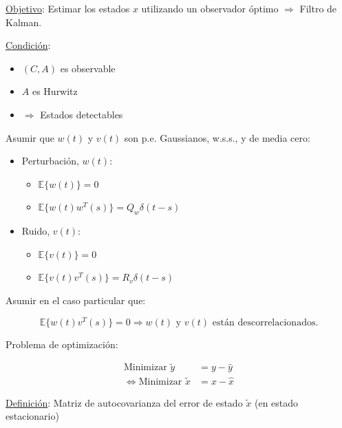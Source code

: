 \par \underline{Objetivo}: Estimar los estados $x$ utilizando un observador óptimo $\Longrightarrow$ Filtro de Kalman.\\

\par \underline{Condición}: 

\begin{itemize}
    \item $(C,A)$ es observable
    \item $A$ es Hurwitz
    \item $\Longrightarrow$ Estados detectables
\end{itemize}

Asumir que $w(t)$ y $v(t)$ son p.e. Gaussianos, w.s.s., y de media cero:

\begin{itemize}
    \item Perturbación, $w(t)$: \begin{itemize}
        \item $\mathbb{E}\{w(t)\}=0$
        \item $\mathbb{E}\{w(t) w^T (s)\}=Q_w \delta(t-s)$
    \end{itemize}
    \item Ruido, $v(t)$: \begin{itemize}
         \item $\mathbb{E}\{v(t)\}=0$
        \item $\mathbb{E}\{v(t) v^T (s)\}=R_v \delta(t-s)$
    \end{itemize}
\end{itemize}

Asumir en el caso particular que:

$$\mathbb{E}\{w(t)v^T (s)\}=0 \Longrightarrow \text{$w(t)$ y $v(t)$ están descorrelacionados.}$$


\par Problema de optimización: 

\begin{align*}
    \text{Minimizar } \tilde{y} &= y-\hat{y}\\
    \Leftrightarrow \text{Minimizar } \tilde{x} &= x - \hat{x}
\end{align*}

\underline{Definición}: Matriz de autocovarianza del error de estado $\tilde{x}$ (en estado estacionario) 

